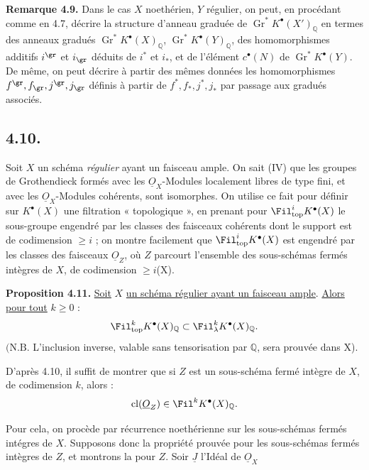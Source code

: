 
\textbf{Remarque 4.9.} Dans le cas \(X\) noethérien, \(Y\) régulier, on peut, en procédant comme en 4.7, décrire la structure d'anneau graduée de \(\operatorname{Gr}^*K^{\bullet}(X')_{\mathbb Q}\) en termes des anneaux gradués \(\operatorname{Gr}^*K^{\bullet}(X)_{\mathbb Q}\), \(\operatorname{Gr}^*K^{\bullet}(Y)_{\mathbb Q}\), des homomorphismes additifs \(i^{\gr}\) et \(i_{\gr}\) déduits de \(i^*\) et \(i_*\), et de l'élément \(c^{\bullet}(N)\) de \(\operatorname{Gr}^*K^{\bullet}(Y)\). De même, on peut décrire à partir des mêmes données les homomorphismes \(f^{\gr},f_{\gr},j^{\gr},j_{\gr}\) définis à partir de \(f^*,f_*,j^*,j_*\) par passage aux gradués associés.

\subsection*{4.10.}

Soit \(X\) un schéma \emph{régulier} ayant un faisceau ample. On sait (IV\qquad) que les groupes de Grothendieck formés avec les \(\underline{O}_X\)-Modules localement libres de type fini, et avec les \(\underline{O}_X\)-Modules cohérents, sont isomorphes. On utilise ce fait pour définir sur \(K^{\bullet}(X)\) une filtration « topologique », en prenant pour \(\Fil^i_{\mathrm{top}}K^{\bullet}(X)\) le sous-groupe engendré par les classes des faisceaux cohérents dont le support est de codimension \(\ge i\) ; on montre facilement que \(\Fil^i_{\mathrm{top}}K^{\bullet}(X)\) est engendré par les classes des faisceaux \(\underline{O}_Z\), où \(Z\) parcourt l'ensemble des sous-schémas fermés intègres de \(X\), de codimension \(\ge i\)(X\qquad).

\textbf{Proposition 4.11.} \uline{Soit} \(X\) \uline{un schéma régulier ayant un faisceau ample}. \uline{Alors} \uline{pour tout} \(k\ge0\) :
\[
  \Fil_{\mathrm{top}}^kK^{\bullet}(X)_{\mathbb Q}
  \subset
  \Fil_\lambda^kK^{\bullet}(X)_{\mathbb Q}.
\]
\((\mathrm{N.B.}\) L'inclusion inverse, valable sans tensorisation par \(\mathbb Q\), sera prouvée dans X\qquad).

D'après 4.10, il suffit de montrer que si \(Z\) est un sous-schéma fermé intègre de \(X\), de codimension \(k\), alors :
\[
  \operatorname{cl}(\underline{O}_Z)\in\Fil^kK^{\bullet}(X)_{\mathbb Q}.
\]

Pour cela, on procède par récurrence noethérienne sur les sous-schémas fermés intégres de \(X\). Supposons donc la propriété prouvée pour les sous-schémas fermés intègres de \(Z\), et montrons la pour \(Z\). Soir \(\underline{J}\) l'Idéal de \(\underline{O}_X\)
